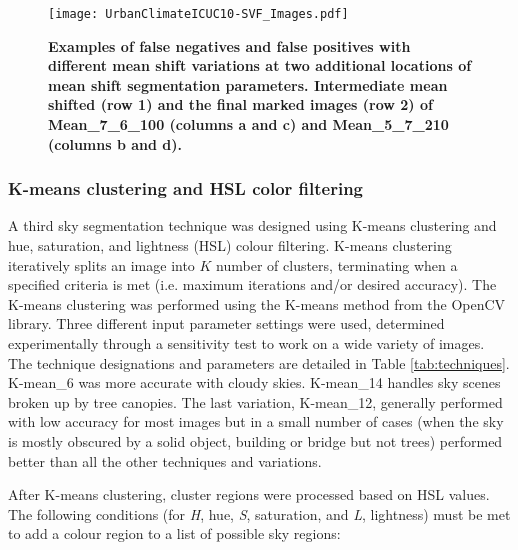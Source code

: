 \documentclass[final,3p,times,authoryear]{elsarticle}
\begin{document}
%

\begin{figure}
\centering   
\texttt{[image: UrbanClimateICUC10-SVF\_Images.pdf]} 
\caption{\bf Examples of false negatives and false positives with different mean shift variations at two additional locations of mean shift segmentation parameters. Intermediate mean shifted (row 1) and the final marked images (row 2) of Mean\_7\_6\_100 (columns a and c) and Mean\_5\_7\_210 (columns b and d).}    
 \label{fig:meanerrors}  
\end{figure} 



\subsubsection{K-means clustering and HSL color filtering}\label{sec:kmeans}
A third sky segmentation technique was designed using K-means clustering and hue, saturation, and lightness (HSL) colour filtering. K-means clustering iteratively splits an image into $K$ number of clusters, terminating when a specified criteria is met (i.e. maximum iterations and/or desired accuracy). The K-means clustering was performed using the K-means method from the OpenCV library. Three different input parameter settings were used, determined experimentally through a sensitivity test to work on a wide variety of images. The technique designations and parameters are detailed in Table \ref{tab:techniques}. K-mean\_6 was more accurate with cloudy skies. K-mean\_14 handles sky scenes broken up by tree canopies. The last variation, K-mean\_12, generally performed with low accuracy for most images but in a small number of cases (when the sky is mostly obscured by a solid object, building or bridge but not trees) performed better than all the other techniques and variations. 

After K-means clustering, cluster regions were processed based on HSL values. The following conditions (for \textit{H}, hue, \textit{S}, saturation, and \textit{L}, lightness) must be met to add a colour region to a list of possible sky regions: 
\end{document}
